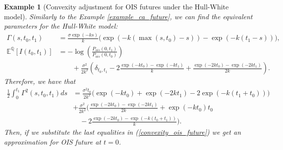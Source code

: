 \documentclass[a4paper,10pt]{article}
\newtheorem{example}[theorem]{Example}
\newcommand{\1}{\mathbf{1}}
\begin{document}
\begin{example}[Convexity adjustment for OIS futures under the Hull-White model]\label{example_convexity_hw_ois}
Similarly to the Example \ref{example_ca_future}, we can find the equivalent parameters for the Hull-White model: 
\begin{align*}
\Gamma(s,t_0,t_1) &= \frac{\sigma \exp(-ks)}{k}\biggl(\exp(-k(\max(s,t_0) - s)) - \exp(-k(t_1-s))\biggr),\\
\mathbb{E}^{\mathbb{Q}}\left[I(t_0,t_1)\right]&=-\log\left(\frac{P_{ois}(0,t_1)}{P_{ois}(0,t_0)}\right)\\
& \text{ }\text{ }\text{ }+ \frac{\sigma^{2}}{2k^{2}}\left(\delta_{t_0,t_1} - 2 \frac{\exp(-kt_0) - \exp(-kt_1)}{k} + \frac{\exp(-2kt_0) - \exp(-2kt_1)}{2k}  \right).
\end{align*}
Therefore, we have that
\begin{align*}
\frac{1}{2}\int_{0}^{t_1} \Gamma^{2}(s,t_0,t_1) ds &= \frac{\sigma^{2}t_0}{2k^{2}} \biggl( \exp(-kt_0) + \exp(-2kt_1) - 2 \exp(-k(t_1+t_0)) \biggr)\\  
&+ \frac{\sigma^{2}}{2k^{2}} \biggl(\frac{\exp(-2kt_0) - \exp(-2kt_1)}{2k}  + \exp(-kt_0)t_0 \\
&\quad - 2 \frac{\exp(-2kt_0) - \exp(-k(t_0 + t_1))}{k}  \biggr).
\end{align*}
Then, if we substitute the last equalities in (\ref{convexity_ois_future}) we get an approximation for OIS future at $t=0$.\\


\end{example}
\end{document}
